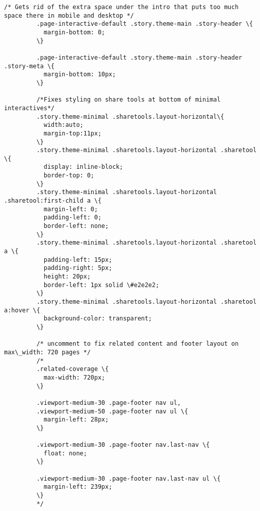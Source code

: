 \documentclass[11pt]{article}
\begin{document}
\begin{Verbatim}[commandchars=\\\{\}]
         /* Gets rid of the extra space under the intro that puts too much space there in mobile and desktop */
         .page-interactive-default .story.theme-main .story-header \{
           margin-bottom: 0;
         \}
         
         .page-interactive-default .story.theme-main .story-header .story-meta \{
           margin-bottom: 10px;
         \}
         
         /*Fixes styling on share tools at bottom of minimal interactives*/
         .story.theme-minimal .sharetools.layout-horizontal\{
           width:auto;
           margin-top:11px;
         \}
         .story.theme-minimal .sharetools.layout-horizontal .sharetool \{
           display: inline-block;
           border-top: 0;
         \}
         .story.theme-minimal .sharetools.layout-horizontal .sharetool:first-child a \{
           margin-left: 0;
           padding-left: 0;
           border-left: none;
         \}
         .story.theme-minimal .sharetools.layout-horizontal .sharetool a \{
           padding-left: 15px;
           padding-right: 5px;
           height: 20px;
           border-left: 1px solid \#e2e2e2;
         \}
         .story.theme-minimal .sharetools.layout-horizontal .sharetool a:hover \{
           background-color: transparent;  
         \}
         
         /* uncomment to fix related content and footer layout on max\_width: 720 pages */
         /*
         .related-coverage \{
           max-width: 720px;
         \}
         
         .viewport-medium-30 .page-footer nav ul,
         .viewport-medium-50 .page-footer nav ul \{
           margin-left: 28px;
         \}
         
         .viewport-medium-30 .page-footer nav.last-nav \{
           float: none;
         \}
         
         .viewport-medium-30 .page-footer nav.last-nav ul \{
           margin-left: 239px;
         \}
         */
         

\end{Verbatim}
\end{document}

